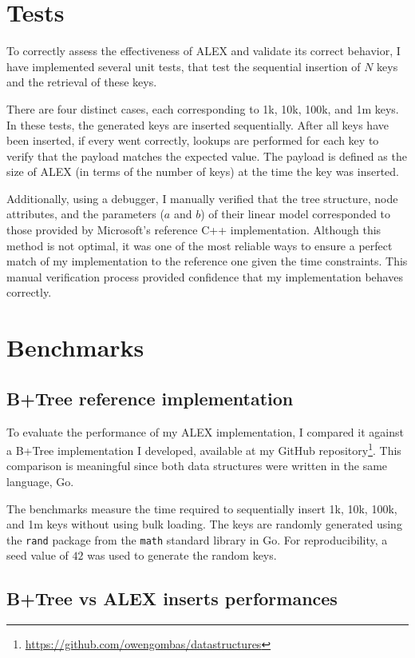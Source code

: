 \let\clearpage\relax
\chapter{Tests}
To correctly assess the effectiveness of ALEX and validate its correct behavior, I have implemented several unit tests, that test the sequential insertion of $N$ keys and the retrieval of these keys.

There are four distinct cases, each corresponding to 1k, 10k, 100k, and 1m keys. In these tests, the generated keys are inserted sequentially. After all keys have been inserted, if every went correctly, lookups are performed for each key to verify that the payload matches the expected value. The payload is defined as the size of ALEX (in terms of the number of keys) at the time the key was inserted.

Additionally, using a debugger, I manually verified that the tree structure, node attributes, and the parameters ($a$ and $b$) of their linear model corresponded to those provided by Microsoft's reference C++ implementation. Although this method is not optimal, it was one of the most reliable ways to ensure a perfect match of my implementation to the reference one given the time constraints. This manual verification process provided confidence that my implementation behaves correctly.

\let\clearpage\relax
\chapter{Benchmarks}
\section{B+Tree reference implementation}

To evaluate the performance of my ALEX implementation, I compared it against a B+Tree implementation I developed, available at my GitHub repository\footnote{\url{https://github.com/owengombas/datastructures}}. This comparison is meaningful since both data structures were written in the same language, Go.

The benchmarks measure the time required to sequentially insert 1k, 10k, 100k, and 1m keys without using bulk loading. The keys are randomly generated using the \texttt{rand} package from the \texttt{math} standard library in Go. For reproducibility, a seed value of $42$ was used to generate the random keys.

\section{B+Tree vs ALEX inserts performances}
